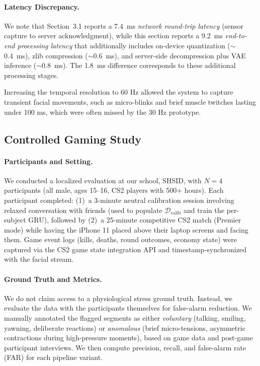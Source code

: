 \documentclass[sigconf]{acmart}
\begin{document}
\paragraph{Latency Discrepancy.}
We note that Section~3.1 reports a 7.4~ms \emph{network round-trip latency} (sensor capture to server acknowledgment), while this section reports a 9.2~ms \emph{end-to-end processing latency} that additionally includes on-device quantization ($\sim$0.4~ms), zlib compression ($\sim$0.6~ms), and server-side decompression plus VAE inference ($\sim$0.8~ms). The 1.8~ms difference corresponds to these additional processing stages.

Increasing the temporal resolution to 60 Hz allowed the system to capture transient facial movements, such as micro-blinks and brief muscle twitches lasting under 100 ms, which were often missed by the 30 Hz prototype.

\subsection{Controlled Gaming Study}

\paragraph{Participants and Setting.}
We conducted a localized evaluation at our school, SHSID, with $N = 4$ participants (all male, ages 15--16, CS2 players with 500+ hours). Each participant completed: (1)~a 3-minute neutral calibration session involving relaxed conversation with friends (used to populate $\mathcal{D}_{\text{calib}}$ and train the per-subject GRU), followed by (2)~a 25-minute competitive CS2 match (Premier mode) while having the iPhone 11 placed above their laptop screens and facing them. Game event logs (kills, deaths, round outcomes, economy state) were captured via the CS2 game state integration API and timestamp-synchronized with the facial stream.

\paragraph{Ground Truth and Metrics.}
We do not claim access to a physiological stress ground truth. Instead, we evaluate the data with the participants themselves for false-alarm reduction. We manually annotated the flagged segments as either \emph{voluntary} (talking, smiling, yawning, deliberate reactions) or \emph{anomalous} (brief micro-tensions, asymmetric contractions during high-pressure moments), based on game data and post-game participant interviews. We then compute precision, recall, and false-alarm rate (FAR) for each pipeline variant.
\end{document}

